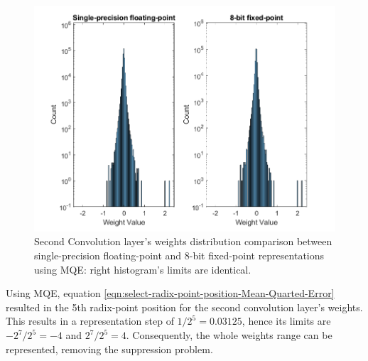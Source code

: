 \begin{figure} [H]
	\centering
	\includegraphics[scale=0.9]{Images/Weights-distributions/original-vs-fixed8/weight-distribution-conv2-MQE.png}
	\decoRule
	\caption[Second Convolution layer's weights distribution comparison between single-precision floating-point and 8-bit fixed-point representations using MQE]{Second Convolution layer's weights distribution comparison between single-precision floating-point and 8-bit fixed-point representations using MQE: right histogram's limits are identical.}
	\label{fig:weight-distribution-comparison-conv2-MQE}
\end{figure}

Using MQE, equation \ref{eqn:select-radix-point-position-Mean-Quarted-Error} resulted in the 5th radix-point position for the second convolution layer's weights. This results in a representation step of $1/2^5 = 0.03125$, hence its limits are $-2^7/2^5 = -4$ and $2^7/2^5 = 4$. Consequently, the whole weights range can be represented, removing the suppression problem.

